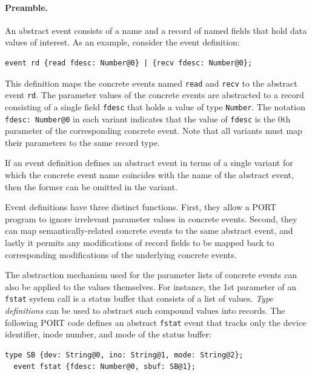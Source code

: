 \paragraph*{Preamble.}

An abstract event consists of a name and a record of named fields that hold data values of interest. As an example, consider the event definition:
\begin{lstlisting}[numbers=none,xleftmargin=0em,gobble=2,columns=strict]
  event rd {read fdesc: Number@0} | {recv fdesc: Number@0};
\end{lstlisting}
This definition maps the concrete events named \lstinline+read+ and \lstinline+recv+ to the abstract event \lstinline+rd+. The parameter values of the concrete events are abstracted to a record consisting of a single field \lstinline+fdesc+ that holds a value of type \lstinline+Number+. The notation \lstinline+fdesc: Number@0+ in each variant indicates that the value of \lstinline+fdesc+ is the 0th parameter of the corresponding concrete event. Note that all variants must map their parameters to the same record type.

If an event definition defines an abstract event in terms of a single variant for which the concrete event name coincides with the name of the abstract event, then the former can be omitted in the variant.

Event definitions have three distinct functions. First, they allow a PORT program to ignore
irrelevant parameter values in concrete events. Second, they can map semantically-related concrete events to the same abstract event, and lastly it permits any modifications of record fields to be mapped back to corresponding modifications of the underlying concrete events.

The abstraction mechanism used for the parameter lists of concrete events can also be applied to the values themselves. For instance, the 1st parameter of an \lstinline+fstat+ system call is a status buffer that consists of a list of values. \emph{Type definitions} can be used to abstract such compound values into records. The following PORT code defines an abstract \lstinline+fstat+ event that tracks only the device identifier, inode number, and mode of the status buffer:
\begin{lstlisting}[numbers=none,xleftmargin=0em,gobble=2]
  type SB {dev: String@0, ino: String@1, mode: String@2};
  event fstat {fdesc: Number@0, sbuf: SB@1};
\end{lstlisting}

